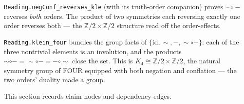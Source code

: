 \begin{theorem}\label{thm:negconf-reverses}\leanok{}
\texttt{Reading.negConf\_reverses\_kle} (with its truth-order companion) proves ${\sim}\circ{-}$ reverses \emph{both} orders. The product of two symmetries each reversing exactly one order reverses both --- the $\mathbb{Z}/2 \times \mathbb{Z}/2$ structure read off the order-effects.
\end{theorem}
\begin{theorem}\label{thm:klein-four-symmetry}\leanok{}
\texttt{Reading.klein\_four} bundles the group facts of $\{\mathrm{id}, \sim, -, {\sim}\circ{-}\}$: each of the three nontrivial elements is an involution, and the products $\sim\circ- = {\sim}\circ{-} = -\circ\sim$ close the set. This is $K_4 \cong \mathbb{Z}/2 \times \mathbb{Z}/2$, the natural symmetry group of FOUR equipped with both negation and conflation --- the two orders' duality made a group.
\end{theorem}

This section records claim nodes and dependency edges.

